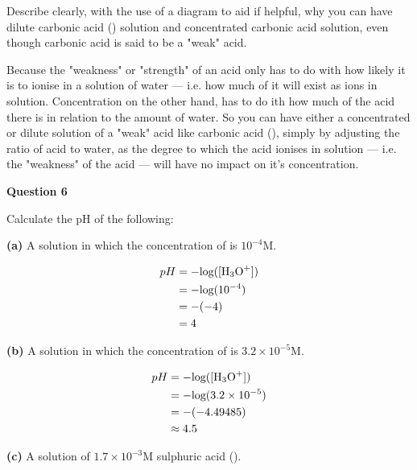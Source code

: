 \documentclass{article}
\begin{document}
{Describe clearly, with the use of a diagram to aid if helpful, why you can have dilute carbonic acid () solution and concentrated carbonic acid solution, even though carbonic acid is said to be a "weak" acid.
\vspace{0.2cm}

{\color{red}
Because the "weakness" or "strength" of an acid only has to do with how likely it is to ionise in a solution of water --- i.e. how much of it will exist as ions in solution. Concentration on the other hand, has to do ith how much of the acid there is in relation to the amount of water. So you can have either a concentrated or dilute solution of a "weak" acid like carbonic acid (), simply by adjusting the ratio of acid to water, as the degree to which the acid ionises in solution --- i.e. the "weakness" of the acid --- will have no impact on it's concentration.
}

\pagebreak
\vspace{0.2cm}
\hspace{1cm}
\textbf{Question 6} 
\vspace{0.2cm}

Calculate the pH of the following:
\vspace{0.2cm}

\textbf{(a)} A solution in which the concentration of  is $10^{-4}$M.

{\color{red}
\begin{align*}
  pH  &= -\text{log}([\text{\ce{H_3O^+}}]) \\
      &= -\text{log}(10^{-4}) \\
      &= -(-4) \\
      &= 4
\end{align*}
}

\textbf{(b)} A solution in which the concentration of  is $3.2 \times 10^{-5}$M.

{\color{red}
\begin{align*}
  pH  &= -\text{log}([\text{\ce{H_3O^+}}]) \\
      &= -\text{log}(3.2 \times 10^{-5}) \\
      &= -(-4.49485) \\
      &\approx 4.5
\end{align*}
}

\textbf{(c)} A solution of $1.7 \times 10^{-3}$M sulphuric acid ().

{\color{red}
\begin{center}
\end{center}

}}
\end{document}
